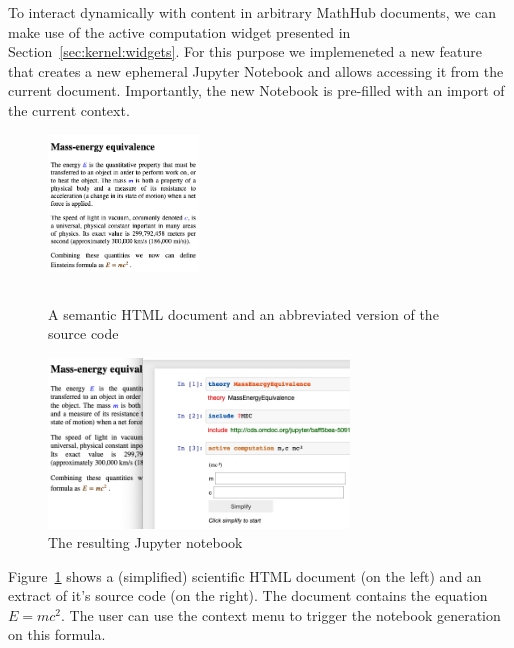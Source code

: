 To interact dynamically with content in arbitrary MathHub documents, we can make use of the active computation widget presented in Section~\ref{sec:kernel:widgets}. 
For this purpose we implemeneted a new feature that creates a new ephemeral Jupyter Notebook and allows accessing it from the current document. 
Importantly, the new Notebook is pre-filled with an import of the current context. 

\begin{figure}[h]
  \begin{minipage}[c]{4cm}
  \vspace{-20pt}
  \includegraphics[width=4cm]{screenshots/sciencedoc}
  \end{minipage}
  \begin{minipage}[c]{7cm}
    
    \begin{lstlisting}
    \end{lstlisting}
  \end{minipage}
  \caption{A semantic HTML document and an abbreviated version of the source code}\label{fig:conversionHTML}
\end{figure}

\begin{figure}
\includegraphics[width=8cm]{screenshots/emc}
\caption{The resulting Jupyter notebook}\label{fig:conversionNotebook}
\end{figure}

Figure~\ref{fig:conversionHTML} shows a (simplified) scientific HTML document (on the left) and an extract of it's source code (on the right). 
The document contains the equation $E=mc^2$. 
The user can use the context menu to trigger the notebook generation on this formula.

